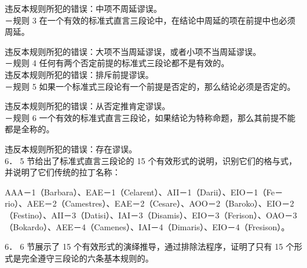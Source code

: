 违反本规则所犯的错误：中项不周延谬误。\\
－规则 3 在一个有效的标准式直言三段论中，在结论中周延的项在前提中也必须周延。

违反本规则所犯的错误：大项不当周延谬误，或者小项不当周延谬误。\\
－规则 4 任何有两个否定前提的标准式三段论都不是有效的。\\
违反本规则所犯的错误：排斥前提谬误。\\
－规则 5 如果一个标准式三段论有一个前提是否定的，那么结论必须是否定的。

违反本规则所犯的错误：从否定推肯定谬误。\\
－规则 6 一个有效的标准式直言三段论，如果结论为特称命题，那么其前提不能都是全称的。

违反本规则所犯的错误：存在谬误。\\
6． 5 节给出了标准式直言三段论的 15 个有效形式的说明，识别它们的格与式，并说明了它们传统的拉丁名称：

AAA－1（Barbara）、EAE－1（Celarent）、AII－1（Darii）、EIO－1（Fe－ rio）、AEE－2（Camestres）、EAE－2（Cesare）、AOO－2（Baroko）、EIO－2\\
（Festino）、AII－3（Datisi）、IAI－3（Disamis）、EIO－3（Ferison）、OAO－3 （Bokardo）、AEE－4（Camenes）、IAI－4（Dimaris）、EIO－4（Fresison）。

6． 6 节展示了 15 个有效形式的演绎推导，通过排除法程序，证明了只有 15 个形式是完全遵守三段论的六条基本规则的。 